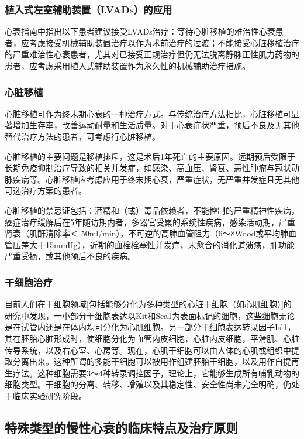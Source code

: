 \subsubsection{植入式左室辅助装置（LVADs）的应用}

心衰指南中指出以下患者建议接受LVADs治疗：等待心脏移植的难治性心衰患者，应考虑接受机械辅助装置治疗以作为术前治疗的过渡；不能接受心脏移植治疗的严重难治性心衰患者，尤其对已接受正规治疗但仍无法脱离静脉正性肌力药物的患者，应考虑采用植入式辅助装置作为永久性的机械辅助治疗措施。

\subsubsection{心脏移植}

心脏移植可作为终末期心衰的一种治疗方式。与传统治疗方法相比，心脏移植可显著增加生存率，改善运动耐量和生活质量。对于心衰症状严重，预后不良及无其他替代治疗方法的患者，可考虑行心脏移植。

心脏移植的主要问题是移植排斥，这是术后1年死亡的主要原因。远期预后受限于长期免疫抑制治疗导致的相关并发症，如感染、高血压、肾衰、恶性肿瘤与冠状动脉疾病等。心脏移植应考虑应用于终末期心衰，严重症状，无严重并发症且无其他可选治疗方案的患者。

心脏移植的禁忌证包括：酒精和（或）毒品依赖者，不能控制的严重精神性疾病，癌症治疗缓解后在5年随访期内者，多器官受累的系统性疾病，感染活动期，严重肾衰（肌酐清除率＜
50ml/min），不可逆的高肺血管阻力（6～8Wood或平均肺血管压差大于15mmHg），近期的血栓栓塞性并发症，未愈合的消化道溃疡，肝功能严重受损，或其他预后不良的疾病。

\subsubsection{干细胞治疗}

目前人们在干细胞领域{[}包括能够分化为多种类型的心脏干细胞（如心肌细胞）{]}的研究中发现，一小部分干细胞表达以Kit和Sca1为表面标记的细胞，这些细胞无论是在试管内还是在体内均可分化为心肌细胞。另一部分干细胞表达转录因子Isl1，其在胚胎心脏形成时，使细胞分化为血管内皮细胞，心脏内皮细胞，平滑肌、心脏传导系统，以及右心室、心房等。现在，心肌干细胞可以由人体的心肌或组织中提取分离出来。这种所谓的多能干细胞可以被用作组建胚胎干细胞，以及用作自提再生疗法。这种细胞需要3～4种转录调控因子，理论上，它能够生成所有哺乳动物的细胞类型。干细胞的分离、转移、增殖以及其稳定性、安全性尚未完全明确，仍处于临床实验研究阶段。

\subsection{特殊类型的慢性心衰的临床特点及治疗原则}

